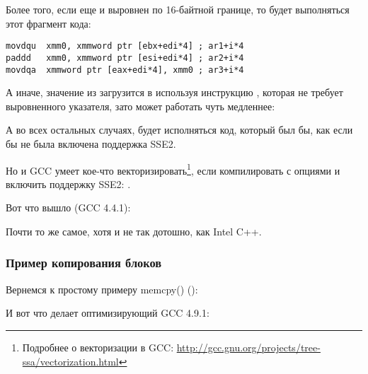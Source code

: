 Более того, если еще и  выровнен по 16-байтной границе, 
то будет выполняться этот фрагмент кода:

\begin{lstlisting}[style=customasmx86]
movdqu  xmm0, xmmword ptr [ebx+edi*4] ; ar1+i*4
paddd   xmm0, xmmword ptr [esi+edi*4] ; ar2+i*4
movdqa  xmmword ptr [eax+edi*4], xmm0 ; ar3+i*4
\end{lstlisting}

А иначе, значение из  загрузится в  используя инструкцию \MOVDQU, 
которая не требует выровненного указателя, зато может работать чуть медленнее:



А во всех остальных случаях, будет исполняться код, который был бы, как если бы не была 
включена поддержка SSE2.


\newcommand{\URLGCCVEC}{\url{http://gcc.gnu.org/projects/tree-ssa/vectorization.html}}

Но и GCC умеет кое-что векторизировать\footnote{Подробнее о векторизации в GCC: \URLGCCVEC}, 
если компилировать с опциями \Othree и включить поддержку SSE2: .

Вот что вышло (GCC 4.4.1):



Почти то же самое, хотя и не так дотошно, как Intel C++.

\subsubsection{Пример копирования блоков}
\label{vec_memcpy}

Вернемся к простому примеру memcpy() ():



И вот что делает оптимизирующий GCC 4.9.1:


